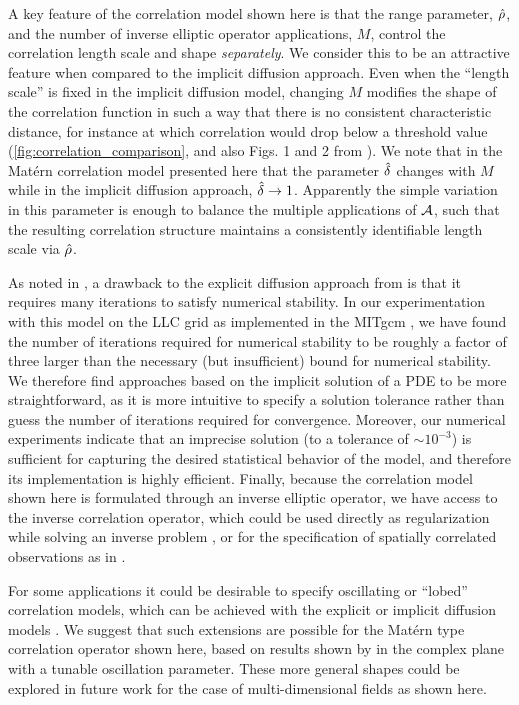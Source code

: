 A key feature of the correlation model shown here is that the range parameter,
$\hat{\rho}$, and the number of inverse elliptic operator applications, $M$,
control the correlation length scale and shape \textit{separately}.
We consider this to be an attractive feature when compared to the implicit
diffusion approach.
Even when the ``length scale'' is fixed in the implicit diffusion model, changing $M$
modifies the shape of the correlation function in such a way that there is no
consistent characteristic distance, for instance at which correlation would drop below a
threshold value
(\cref{fig:correlation_comparison}, and also Figs. 1 and 2 from
\citet{guillet_modelling_2019}).
We note that in the Mat\'ern correlation model presented here that the parameter
$\hat{\delta}$ changes with $M$ while in the implicit diffusion approach, $\hat{\delta}
\rightarrow 1$.
Apparently the simple variation in this parameter is enough to balance the
multiple applications of $\mathcal{A}$, such that the resulting correlation
structure maintains a consistently identifiable length scale via $\hat{\rho}$.

As noted in \citet{mirouze_representation_2010,carrier_background-error_2010}, a
drawback to the explicit diffusion approach from
\citet{weaver_correlation_2001} is that it requires many iterations to satisfy
numerical stability.
In our experimentation with this model on the LLC grid
as implemented in the MITgcm \citep{campin_mitgcmmitgcm_2021}, we have found
the number of iterations required for numerical stability to be roughly a factor
of three larger than the necessary (but insufficient) bound for numerical
stability.
We therefore find approaches based on the implicit solution of a PDE to be more
straightforward, as it is more intuitive to specify a solution tolerance
rather than guess the number of iterations required for convergence.
Moreover, our numerical experiments indicate that
an imprecise solution (to a tolerance of $\sim10^{-3}$)
is sufficient for capturing the desired statistical behavior of the model,
and therefore its implementation is highly efficient.
Finally, because the correlation model shown here is formulated through an
inverse elliptic operator, we have access to the inverse correlation operator,
which could be used directly as regularization while solving an inverse problem
\citep[e.g.,][]{bui-thanh_computational_2013}, or for the specification of
spatially correlated observations as in \citet{guillet_modelling_2019}.

For some applications it could be desirable to specify oscillating or ``lobed''
correlation models, which can be achieved with the explicit or implicit
diffusion models \citep{weaver_correlation_2001,weaver_diffusion_2013}.
We suggest that such extensions are possible for the Mat\'ern type correlation
operator shown here, based on results shown by \citet{RSSB:RSSB777} in the
complex plane with a tunable oscillation parameter.
These more general shapes could be explored in future work for the case of
multi-dimensional fields as shown here.
